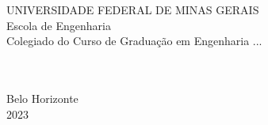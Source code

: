 
\begin{titlepage}

    \begin{center}
        \begin{spacing}{1}
            UNIVERSIDADE FEDERAL DE MINAS GERAIS \\
            Escola de Engenharia \\
            Colegiado do Curso de Graduação em Engenharia ... \\ %
        \end{spacing}
        \vspace{5cm}
        \theauthor \\
        \vspace{5cm}
        \textbf{\MakeUppercase\thetitle}\\
        \vspace*{\fill}
        Belo Horizonte\\2023
    \end{center}

\end{titlepage}
